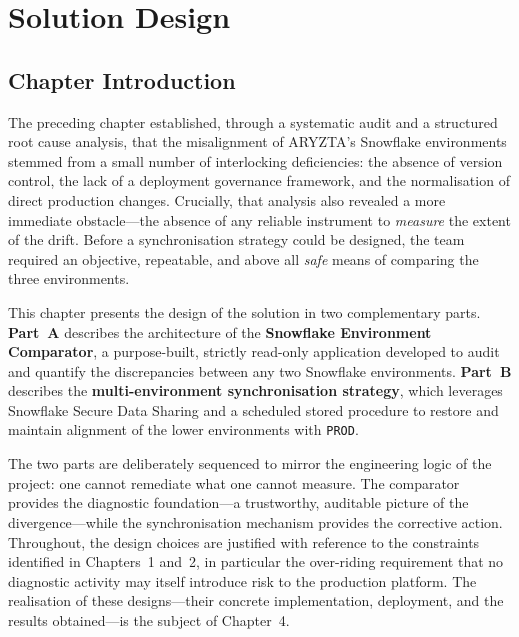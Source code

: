%
\chapter{Solution Design}
\label{chap:design}

\section*{Chapter Introduction}

The preceding chapter established, through a systematic audit and a structured root cause analysis, that the misalignment of ARYZTA's Snowflake environments stemmed from a small number of interlocking deficiencies: the absence of version control, the lack of a deployment governance framework, and the normalisation of direct production changes. Crucially, that analysis also revealed a more immediate obstacle---the absence of any reliable instrument to \emph{measure} the extent of the drift. Before a synchronisation strategy could be designed, the team required an objective, repeatable, and above all \emph{safe} means of comparing the three environments.

This chapter presents the design of the solution in two complementary parts. \textbf{Part~A} describes the architecture of the \textbf{Snowflake Environment Comparator}, a purpose-built, strictly read-only application developed to audit and quantify the discrepancies between any two Snowflake environments. \textbf{Part~B} describes the \textbf{multi-environment synchronisation strategy}, which leverages Snowflake Secure Data Sharing and a scheduled stored procedure to restore and maintain alignment of the lower environments with \texttt{PROD}.

The two parts are deliberately sequenced to mirror the engineering logic of the project: one cannot remediate what one cannot measure. The comparator provides the diagnostic foundation---a trustworthy, auditable picture of the divergence---while the synchronisation mechanism provides the corrective action. Throughout, the design choices are justified with reference to the constraints identified in Chapters~1 and~2, in particular the over-riding requirement that no diagnostic activity may itself introduce risk to the production platform. The realisation of these designs---their concrete implementation, deployment, and the results obtained---is the subject of Chapter~4.

